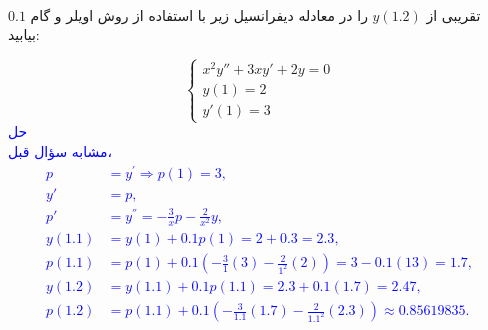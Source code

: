 \\
تقریبی از
$y(1.2)$ 
را در معادله دیفرانسیل زیر با استفاده از روش اویلر و گام 
$0.1$ بیابید:

\[
\begin{cases}
x^2y'' + 3xy' + 2y = 0 \\
y(1) = 2 \\
y'(1) = 3
\end{cases}
\]
\textcolor{blue}{حل
\\
مشابه سؤال قبل،
\begin{align*}
    p &= y^{'} \Rightarrow p(1) = 3, \\
    y' &= p, \\
    p' &= y^{''} = - \frac{3}{x} p - \frac{2}{x^2} y, \\
    y(1.1) &= y(1) + 0.1p(1) = 2 + 0.3 = 2.3, \\
    p(1.1) &= p(1) + 0.1\left(-\frac{3}{1}(3)-\frac{2}{1^2}(2)\right)
             = 3 - 0.1(13) = 1.7, \\
    y(1.2) &= y(1.1) + 0.1p(1.1) = 2.3 + 0.1(1.7) = 2.47, \\
    p(1.2) &= p(1.1) + 0.1\left(-\frac{3}{1.1}(1.7)-\frac{2}{1.1^2}(2.3)\right)
             \approx 0.85619835.
\end{align*}
}

